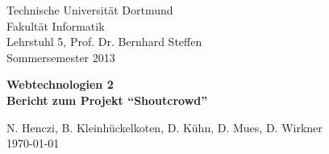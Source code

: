 \begin{titlepage}
\begin{small}
\vfill {Technische Universit\"at Dortmund\\ 
Fakult\"at Informatik\\
Lehrstuhl 5, Prof. Dr. Bernhard Steffen \\
Sommersemester 2013}
\end{small}


\begin{center}
\begin{Large}
\vfill {
\textsf{\textbf{Webtechnologien 2}} \\ 
\textsf{\textbf{Bericht zum Projekt "`Shoutcrowd"'}}
}

\end{Large}
\end{center}

\begin{small}
\vfill N. Henczi, B. Kleinhückelkoten, D. Kühn, D. Mues, D. Wirkner \\ 
\today
\end{small}

\end{titlepage}
